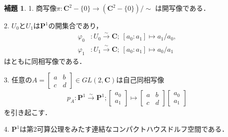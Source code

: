 \documentclass[11pt, a4paper, dvipdfmx, draft]{jsarticle}
\theoremstyle{definition}
\newtheorem{Lemma}[Axiom]{補題}
\newcommand{\cc}{\mathbf{C}}
\newcommand{\pp}{\mathbf{P}}
\newcommand{\dip}{\displaystyle} %
\newcommand{\pphi}{\varphi} %
\theoremstyle{mystyle}
\numberwithin{equation}{section} %
\begin{document}
\begin{Lemma}\label{mnf:p1}
    1. 
    商写像$\pi \colon \cc^{2}-\{0\}
    \longrightarrow\left(\cc^{2}-\{0\}\right)/{\sim}$
    は開写像である．

    2. 
    $U_0$と$U_1$は$\pp^1$の開集合であり，
    \begin{align*}
        \pphi_0&\colon U_0\overset{{\sim}}{\longrightarrow}\cc;\ [a_0\colon a_1]\mapsto a_1/a_0,\\
        \pphi_1&\colon U_1\overset{{\sim}}{\longrightarrow}\cc;\ [a_0\colon a_1]\mapsto a_0/a_1
    \end{align*}
    はともに同相写像である．

    3. 
    任意の$\dip A = \begin{bmatrix}
        a&b\\c&d
    \end{bmatrix}\in GL(2,\cc)$は自己同相写像
    \begin{align*}
        p_A\colon \pp^1\overset{{\sim}}{\longrightarrow}\pp^1;
        \begin{bmatrix}
            a_0\\a_1
        \end{bmatrix}
        \mapsto
        \begin{bmatrix}
            a&b\\c&d
        \end{bmatrix}
        \begin{bmatrix}
            a_0\\a_1
        \end{bmatrix}
    \end{align*}
    を引き起こす．

    4. 
    $\pp^1$は第2可算公理をみたす連結なコンパクトハウスドルフ空間である．
\end{Lemma}
\end{document}
